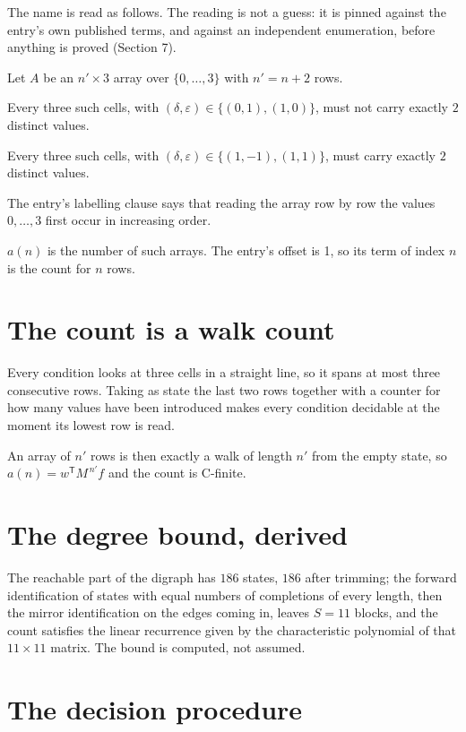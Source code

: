 \documentclass[11pt]{article}
\theoremstyle{definition}
\begin{document}
The name is read as follows. The reading is not a guess: it is pinned against the entry's own published terms, and against an independent enumeration, before anything is proved (Section 7).

Let $A$ be an $n' \times 3$ array over $\{0,\dots,3\}$ with $n' = n + 2$ rows.

Every three such cells, with $(\delta,\varepsilon) \in \{(0,1), (1,0)\}$, must not carry exactly $2$ distinct values.

Every three such cells, with $(\delta,\varepsilon) \in \{(1,-1), (1,1)\}$, must carry exactly $2$ distinct values.

The entry's labelling clause says that reading the array row by row the values $0,\dots,3$ first occur in increasing order.

$a(n)$ is the number of such arrays. The entry's offset is 1, so its term of index $n$ is the count for $n$ rows.

\section{The count is a walk count}

Every condition looks at three cells in a straight line, so it spans at most three consecutive rows. Taking as state the last two rows together with a counter for how many values have been introduced makes every condition decidable at the moment its lowest row is read.

An array of $n'$ rows is then exactly a walk of length $n'$ from the empty state, so $a(n) = w^{\mathsf T}M^{\,n'}f$ and the count is C-finite.

\section{The degree bound, derived}

The reachable part of the digraph has $186$ states, $186$ after trimming; the forward identification of states with equal numbers of completions of every length, then the mirror identification on the edges coming in, leaves $S = 11$ blocks, and the count satisfies the linear recurrence given by the characteristic polynomial of that $11\times11$ matrix. The bound is computed, not assumed.

\section{The decision procedure}
\end{document}
